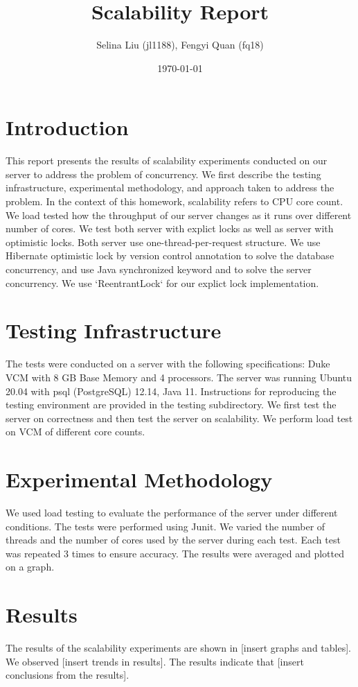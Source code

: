 \documentclass{article}
\begin{document}
\title{Scalability Report}
\author{Selina Liu (jl1188), Fengyi Quan (fq18)}
\date{\today}
\maketitle

\section{Introduction}
This report presents the results of scalability experiments conducted on our server to address the problem of concurrency. We first describe the testing infrastructure, experimental methodology, and approach taken to address the problem. In the context of this homework, scalability refers to CPU core count. We load tested how the throughput of our server changes as it runs over different number of cores. We test both server with explict locks as well as server with optimistic locks. Both server use one-thread-per-request structure. We use Hibernate optimistic lock by version control annotation to solve the database concurrency, and use Java synchronized keyword and to solve the server concurrency. We use `ReentrantLock` for our explict lock implementation.

\section{Testing Infrastructure}
The tests were conducted on a server with the following specifications: Duke VCM with 8 GB Base Memory and 4 processors. The server was running Ubuntu 20.04 with psql (PostgreSQL) 12.14, Java 11. Instructions for reproducing the testing environment are provided in the testing subdirectory. We first test the server on correctness and then test the server on scalability. We perform load test on VCM of different core counts. 

\section{Experimental Methodology}
We used load testing to evaluate the performance of the server under different conditions. The tests were performed using Junit. We varied the number of threads and the number of cores used by the server during each test. Each test was repeated 3 times to ensure accuracy. The results were averaged and plotted on a graph.
\section{Results}
The results of the scalability experiments are shown in [insert graphs and tables]. We observed [insert trends in results]. The results indicate that [insert conclusions from the results].
\end{document}
